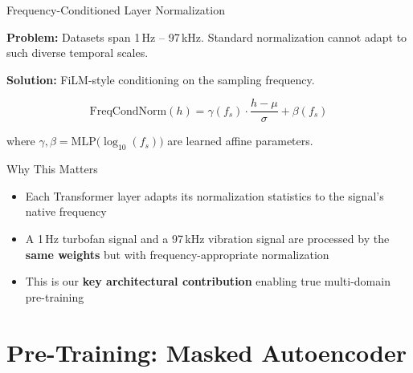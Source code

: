 \documentclass[aspectratio=169, 11pt]{beamer}
\begin{document}

\begin{frame}{Frequency-Conditioned Layer Normalization}

\textbf{Problem:} Datasets span 1\,Hz -- 97\,kHz. Standard normalization cannot adapt to such diverse temporal scales.

\vspace{0.3cm}
\textbf{Solution:} FiLM-style conditioning on the sampling frequency.

\[
\text{FreqCondNorm}(h) = \gamma(f_s) \cdot \frac{h - \mu}{\sigma} + \beta(f_s)
\]

where $\gamma, \beta = \text{MLP}\bigl(\log_{10}(f_s)\bigr)$ are learned affine parameters.

\vspace{0.3cm}
\begin{block}{Why This Matters}
\begin{itemize}
    \item Each Transformer layer adapts its normalization statistics to the signal's native frequency
    \item A 1\,Hz turbofan signal and a 97\,kHz vibration signal are processed by the \textbf{same weights} but with frequency-appropriate normalization
    \item This is our \textbf{key architectural contribution} enabling true multi-domain pre-training
\end{itemize}
\end{block}
\end{frame}

\section{Pre-Training: Masked Autoencoder}
\end{document}

